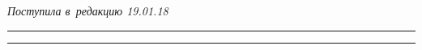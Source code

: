 







\vspace*{-6pt}





\hfill{\small\textit{Поступила в~редакцию 19.01.18}}














\vspace*{8pt}





\hrule





\vspace*{2pt}















\hrule
















\def\tit{ANALYTICAL INFORMATION SYSTEMS PERFORMANCE 


ANALYSIS: METHODOLOGY FOR~TIMETABLE AND~STAFF~QUANTITY~EVALUATION}











\def\titkol{Analytical information systems performance 


analysis: Methodology for timetable evaluation} %










